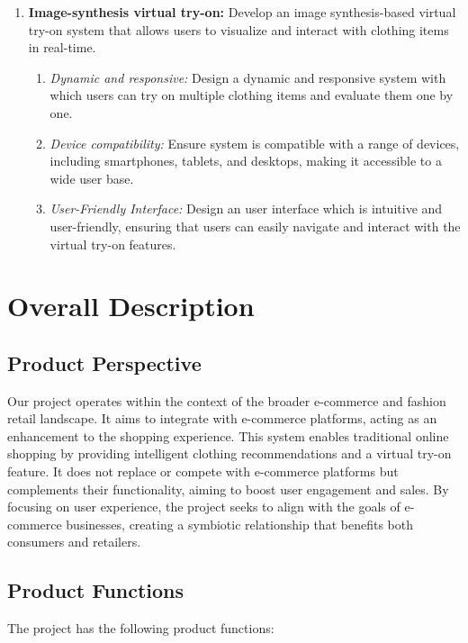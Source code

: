 \begin{enumerate}
\begin{enumerate}
				\end{enumerate}
			\item \textbf{Image-synthesis virtual try-on:} Develop an image synthesis-based virtual try-on system that allows users to visualize and interact with clothing items in real-time.
				\begin{enumerate}
					\item \textit{Dynamic and responsive:} Design a dynamic and responsive system with which users can try on multiple clothing items and evaluate them one by one.
					\item \textit{Device compatibility:} Ensure system is compatible with a range of devices, including smartphones, tablets, and desktops, making it accessible to a wide user base.
					\item \textit{User-Friendly Interface:} Design an user interface which is intuitive and user-friendly, ensuring that users can easily navigate and interact with the virtual try-on features.
				\end{enumerate}
		\end{enumerate}

\section{Overall Description}
	\subsection{Product Perspective}
		Our project operates within the context of the broader e-commerce and fashion retail landscape. It aims to integrate with e-commerce platforms, acting as an enhancement to the shopping experience. This system enables traditional online shopping by providing intelligent clothing recommendations and a virtual try-on feature. It does not replace or compete with e-commerce platforms but complements their functionality, aiming to boost user engagement and sales. By focusing on user experience, the project seeks to align with the goals of e-commerce businesses, creating a symbiotic relationship that benefits both consumers and retailers.
	
	\subsection{Product Functions}
		The project has the following product functions:

